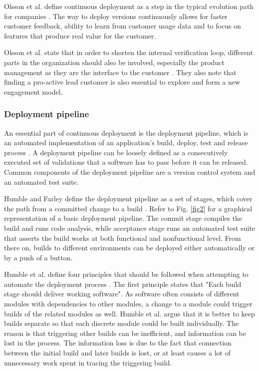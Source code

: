 \documentclass[english]{tktltiki2}
\theoremstyle{definition}
\theoremstyle{remark}
\begin{document}
Olsson et al. define continuous deployment as a step in the typical evolution path for companies \cite{olsson2012climbing}. The way to deploy versions continuously allows for faster customer feedback, ability to learn from customer usage data and to focus on features that produce real value for the customer.  

Olsson et al. state that in order to shorten the internal verification loop, different parts in the organization should also be involved, especially the product management as they are the interface to the customer \cite{olsson2012climbing}. They also note that finding a pro-active lead customer is also essential to explore and form a new engagement model.

\subsubsection{Deployment pipeline}
An essential part of continuous deployment is the deployment pipeline, which is an automated implementation of an application's build, deploy, test and release process \cite{cdbook}. A deployment pipeline can be loosely defined as a consecutively executed set of validations that a software has to pass before it can be released. Common components of the deployment pipeline are a version control system and an automated test suite.

Humble and Farley define the deployment pipeline as a set of stages, which cover the path from a committed change to a build \cite{cdbook}. Refer to Fig. \ref{fig2} for a graphical representation of a basic deployment pipeline. The commit stage compiles the build and runs code analysis, while acceptance stage runs an automated test suite that asserts the build works at both functional and nonfunctional level. From there on, builds to different environments can be deployed either automatically or by a push of a button.

Humble et al. define four principles that should be followed when attempting to automate the deployment process \cite{humble2006deployment}. The first principle states that "Each build stage should deliver working software". As software often consists of different modules with dependencies to other modules, a change to a module could trigger builds of the related modules as well. Humble et al. argue that it is better to keep builds separate so that each discrete module could be built individually. The reason is that triggering other builds can be inefficient, and information can be lost in the process. The information loss is due to the fact that connection between the initial build and later builds is lost, or at least causes a lot of unnecessary work spent in tracing the triggering build. 
\end{document}
